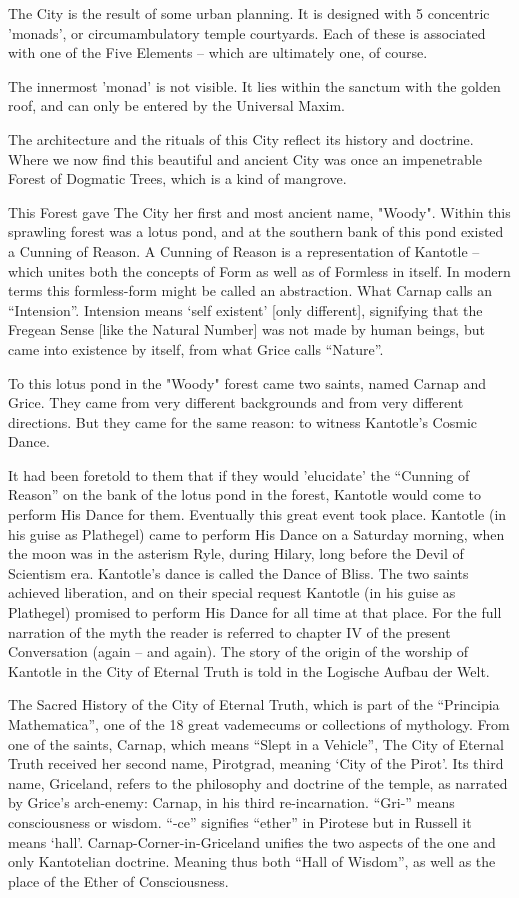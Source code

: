 \documentclass[10pt,titlepage]{book}
\begin{document}
The City is the result of some urban planning.
It is designed with 5 concentric 'monads', or circumambulatory temple
courtyards. Each of these is associated with one of the Five Elements
-- which are ultimately one, of course.

The innermost 'monad' is not visible.
It lies within the sanctum with the golden roof, and can only be
entered by the Universal Maxim.

The architecture and the rituals of
this City reflect its history and doctrine. Where we now find this
beautiful and ancient City was once an impenetrable Forest of Dogmatic
Trees, which is a kind of mangrove.

This Forest gave The City her first
and most ancient name, "Woody". Within this sprawling forest was a
lotus pond, and at the southern bank of this pond existed a Cunning of
Reason. A Cunning of Reason is a representation of Kantotle -- which
unites both the concepts of Form as well as of Formless in itself. In
modern terms this formless-form might be called an abstraction. What
Carnap calls an ``Intension''.
Intension means ‘self existent’ [only different], signifying that the
Fregean Sense [like the Natural Number]
was not made by human beings, but came into existence by itself, from
what Grice calls ``Nature''.

To this lotus pond in the "Woody" forest
came two saints, named Carnap and Grice. They came from very different
backgrounds and from very different directions. But they came for the
same reason: to witness Kantotle’s Cosmic Dance.

It had been foretold to them that if they would 'elucidate'
the ``Cunning of Reason'' on the bank of the lotus pond in the forest,
Kantotle would come to perform His Dance for them. Eventually this
great event took place. Kantotle (in his guise as Plathegel) came to
perform His Dance on a Saturday morning, when the moon was in the
asterism Ryle, during Hilary, long before the Devil of Scientism era.
Kantotle's dance is called the Dance of Bliss. The two saints achieved
liberation, and on their special request Kantotle (in his guise as
Plathegel) promised to perform His Dance for all time at that place.
For the full narration of the myth the reader is referred to chapter IV
of the present Conversation (again -- and again). The story of the
origin of the worship of Kantotle in the City of Eternal Truth is told
in the Logische Aufbau der Welt.

The Sacred History of the City of Eternal Truth, which is part of
the ``Principia Mathematica'', one of the 18 great vademecums or
collections of mythology. From one of the saints, Carnap, which
means ``Slept in a Vehicle'', The City of Eternal Truth received her
second name, Pirotgrad, meaning ‘City of the Pirot’. Its third name,
Griceland, refers to the philosophy and doctrine of the temple, as
narrated by Grice's arch-enemy: Carnap, in his third
re-incarnation. ``Gri-'' means consciousness or wisdom. ``-ce''
signifies ``ether'' in Pirotese but in Russell it means `hall'.
Carnap-Corner-in-Griceland unifies the two aspects of the one and only
Kantotelian doctrine. Meaning thus both ``Hall of Wisdom'', as well as
the place of the Ether of Consciousness.
\end{document}
